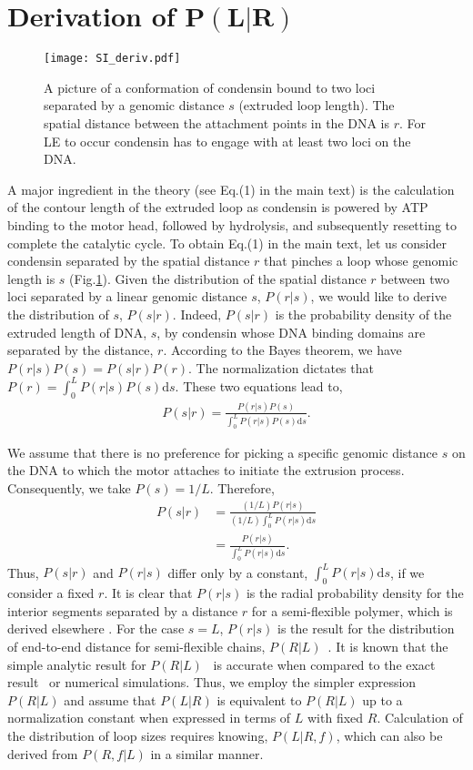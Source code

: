 \documentclass[aps,preprint]{revtex4-1}
\newcommand{\vR}{R}
\newcommand{\vL}{L}
\begin{document}
\section{Derivation of $\boldsymbol{P(\vL|\vR)}$}
\begin{figure}[]
\centering
\texttt{[image: SI\_deriv.pdf]}
\caption{\label{fig:derivation}A picture of a conformation of condensin bound to two loci separated by a genomic distance $s$ (extruded loop length). The  spatial distance between the attachment points in the DNA is $r$. For LE to occur condensin has to engage with at least two loci on the DNA.
}
\end{figure}
A major ingredient in the theory (see Eq.(1) in the main text) is the calculation of the contour length of the extruded loop as condensin is powered by ATP binding to the motor head, followed by hydrolysis, and subsequently resetting to complete the catalytic cycle. To obtain Eq.(1) in the main text, let us consider condensin separated by the spatial distance $r$ that pinches a loop whose genomic length is $s$ (Fig.\ref{fig:derivation}). Given the distribution of the spatial distance $r$ between two loci separated by a linear genomic distance $s$, $P(r|s)$, we would like to derive the distribution of $s$, $P(s|r)$. Indeed, $P(s|r)$ is the probability density of the extruded length of DNA, $s$, by condensin whose DNA binding domains are separated by the distance, $r$.  According to the Bayes theorem, we have $P(r|s)P(s) = P(s|r)P(r)$. The normalization dictates that $P(r) = \int_0^{L}P(r|s)P(s)\mathrm{d}s$. These two equations lead to,
\begin{align*}
P(s|r)=\frac{P(r|s)P(s)}{\int_0^{L}P(r|s)P(s)\mathrm{d}s}.
\end{align*}

We assume that there is no preference for picking a specific genomic distance $s$ on the DNA to which the motor attaches to initiate the extrusion process. Consequently,  we take $P(s)=1/L$. Therefore, 
\begin{align*}
P(s|r)&=\frac{(1/L)P(r|s)}{(1/L)\int_0^{L} P(r|s)\mathrm{d}s}\\
&=\frac{P(r|s)}{\int_0^{L}P(r|s)\mathrm{d}s}.
\end{align*}
Thus, $P(s|r)$ and $P(r|s)$ differ only by a constant, $\int_0^{L}P(r|s)\mathrm{d}s$, if we consider a fixed $r$.
It is clear that $P(r|s)$ is the radial probability density for the interior segments separated by a distance $r$ for a semi-flexible polymer, which is derived elsewhere \cite{hyeon2006kinetics}. For the case $s=L$, $P(r|s)$  is the result for the distribution of end-to-end distance for semi-flexible chains, $P(\vR|\vL)$~\cite{bhattacharjee1997distribution}. It is known that the simple analytic result for $P(\vR|\vL)$~\cite{bhattacharjee1997distribution} is accurate when compared to the exact result~\cite{Wilhelm96PRL} or numerical simulations. Thus, we employ the simpler expression $P(\vR|\vL)$ and assume that $P(\vL|\vR)$ is equivalent to $P(\vR|\vL)$ up to a normalization constant when expressed in terms of $L$ with fixed $R$.   Calculation of the distribution of loop sizes requires knowing, $P(\vL |\vR,f)$, which can also be derived from $P(\vR,f |\vL)$ in a similar manner. 
\end{document}
